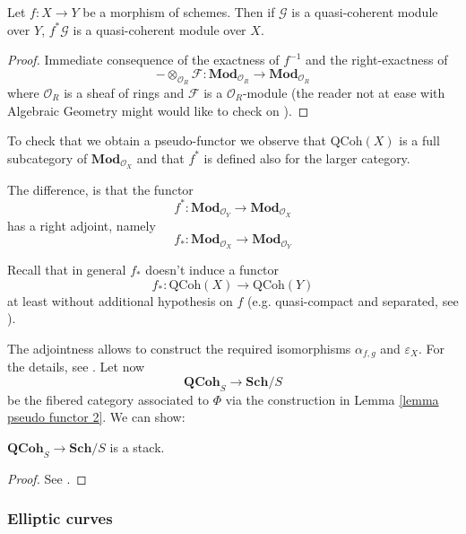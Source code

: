 \begin{refsection}
\begin{lemma}
Let $f \colon X \to Y$ be a morphism of schemes. Then if $\mathcal G$ is a quasi-coherent module over $Y$, $f^* \mathcal G$ is a quasi-coherent module over $X$.
\end{lemma}

\begin{proof}
Immediate consequence of the exactness of $f^{-1}$ and the right-exactness of
\[
- \otimes_{\mathcal O_R} \mathcal F \colon \mathbf{Mod}_{\mathcal O_R} \to \mathbf{Mod}_{\mathcal O_R}
\]
where $\mathcal O_R$ is a sheaf of rings and $\mathcal F$ is a $\mathcal O_R$-module (the reader not at ease with Algebraic Geometry might would like to check on \cite[Prop. II.5.8.(a)]{hartshorne}).
\end{proof}

To check that we obtain a pseudo-functor we observe that $\mathrm{QCoh}(X)$ is a full subcategory of $\mathbf{Mod}_{\mathcal O_X}$ and that $f^*$ is defined also for the larger category.


The difference, is that the functor
\[
f^* \colon \mathbf{Mod}_{\mathcal O_Y} \to \mathbf{Mod}_{\mathcal O_X}
\]
has a right adjoint, namely
\[
f_* \colon \mathbf{Mod}_{\mathcal O_X} \to \mathbf{Mod}_{\mathcal O_Y}
\]

\begin{rmk}
Recall that in general $f_*$ doesn't induce a functor
\[
f_* \colon \mathrm{QCoh}(X) \to \mathrm{QCoh}(Y)
\]
at least without additional hypothesis on $f$ (e.g. quasi-compact and separated, see \cite[Prop. II.5.8.(c)]{hartshorne}).
\end{rmk}

The adjointness allows to construct the required isomorphisms $\alpha_{f,g}$ and $\varepsilon_X$. For the details, see \cite[Ch. 3.2.1]{vistoli}. Let now
\[
\mathbf{QCoh}_S \to \mathbf{Sch}/S
\]
be the fibered category associated to $\Phi$ via the construction in Lemma \ref{lemma pseudo functor 2}. We can show:

\begin{thm}
$\mathbf{QCoh}_S \to \mathbf{Sch}/S$ is a stack.
\end{thm}

\begin{proof}
See \cite[Thm. 4.23]{vistoli}.
\end{proof}

\subsubsection{Elliptic curves}


\end{refsection}
